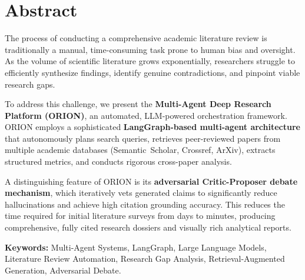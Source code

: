 \documentclass[12pt, a4paper]{article}
\begin{document}
\newpage
{}

\section*{Abstract}

The process of conducting a comprehensive academic literature review is traditionally a manual,
time-consuming task prone to human bias and oversight. As the volume of scientific literature
grows exponentially, researchers struggle to efficiently synthesize findings, identify genuine
contradictions, and pinpoint viable research gaps.

To address this challenge, we present the \textbf{Multi-Agent Deep Research Platform (ORION)},
an automated, LLM-powered orchestration framework. ORION employs a sophisticated
\textbf{LangGraph-based multi-agent architecture} that autonomously plans search queries,
retrieves peer-reviewed papers from multiple academic databases (Semantic~Scholar, Crossref,
ArXiv), extracts structured metrics, and conducts rigorous cross-paper analysis.

A distinguishing feature of ORION is its \textbf{adversarial Critic-Proposer debate mechanism},
which iteratively vets generated claims to significantly reduce hallucinations and achieve high
citation grounding accuracy. This reduces the time required for initial literature surveys from
days to minutes, producing comprehensive, fully cited research dossiers and visually rich
analytical reports.

\vspace{0.5cm}
\noindent\textbf{Keywords:} Multi-Agent Systems, LangGraph, Large Language Models,
Literature Review Automation, Research Gap Analysis, Retrieval-Augmented Generation,
Adversarial Debate.

\newpage

\tableofcontents
\newpage
{}
\onehalfspacing

\end{document}
